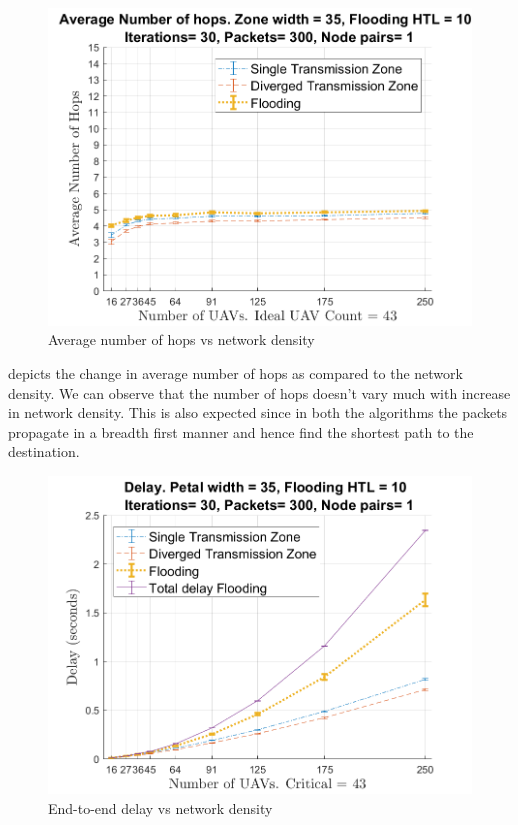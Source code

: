 \begin{figure}[hbtp]
\centering
\includegraphics[width=1\textwidth]{ncsuthesis-0.6/Chapter-5/figs/ND_hops}
\caption{Average number of hops vs network density}
\label{fig:ND_hops}
\end{figure}

 depicts the change in average number of hops as compared to the network density. We can observe that the number of hops doesn't vary much with increase in network density. This is also expected since in both the algorithms the packets propagate in a breadth first manner and hence find the shortest path to the destination. 

\begin{figure}[hbtp]
\centering
\includegraphics[width=1\textwidth]{ncsuthesis-0.6/Chapter-5/figs/ND_delay}
\caption{End-to-end delay vs network density}
\label{fig:ND_delay}
\end{figure}


